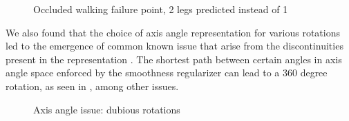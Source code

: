 \begin{figure}[!ht]
    \centering
    \hfil
    \hfil
    \caption{Occluded walking failure point, 2 legs predicted instead of 1}
    \label{fig:humor_bad_occluded_walking}
\end{figure}

We also found that the choice of axis angle representation for various rotations led to the emergence of common known issue that arise from the discontinuities present in the representation \cite{aa_6d_angles}. The shortest path between certain angles in axis angle space enforced by the smoothness regularizer can lead to a 360 degree rotation, as seen in , among other issues.

\begin{figure}[!ht]
    \centering
    \hfil
    \hfil
    \caption{Axis angle issue: dubious rotations}
    \label{fig:humor_bad_aa}
\end{figure}

